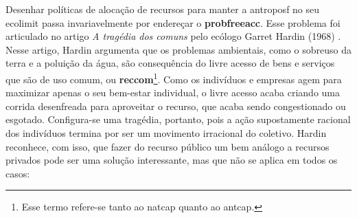 \documentclass[./main.tex]{subfiles}
\begin{document}
\par Desenhar políticas de alocação de recursos para manter a \gls{antroposf} no seu \gls{ecolimit} passa invariavelmente por endereçar o \textbf{\gls{probfreeacc}}. Esse problema foi articulado no artigo \textit{A tragédia dos comuns} pelo ecólogo Garret Hardin (1968) \cite{Hardin1968a}. Nesse artigo, Hardin argumenta que os problemas ambientais, como o sobreuso da terra e a poluição da água, são consequência do livre acesso de bens e serviços que são de uso comum, ou \textbf{\gls{reccom}}\footnote{Esse termo refere-se tanto ao \gls{natcap} quanto ao \gls{antcap}.}. Como os indivíduos e empresas agem para maximizar apenas o seu bem-estar individual, o livre acesso acaba criando uma corrida desenfreada para aproveitar o recurso, que acaba sendo congestionado ou esgotado. Configura-se uma tragédia, portanto, pois a ação supostamente racional dos indivíduos termina por ser um movimento irracional do coletivo. Hardin reconhece, com isso, que fazer do recurso público um bem análogo a recursos privados pode ser uma solução interessante, mas que não se aplica em todos os casos:
\end{document}
